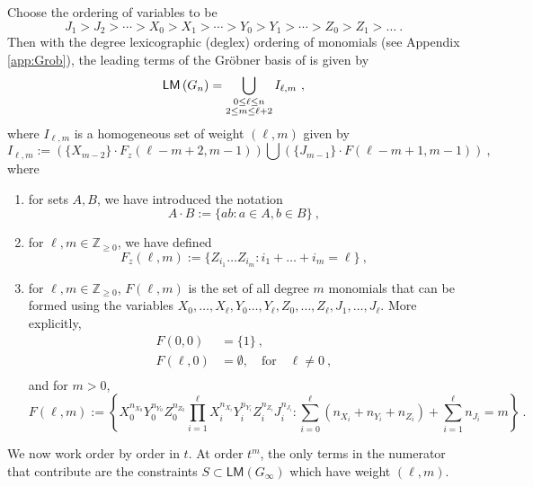 \documentclass[a4paper,10pt]{article}
\newcommand{\mr}[1]{\mathsf{#1}}
\def\IZ{{\mathds{Z}}}
\begin{document}
\begin{conj}
Choose the ordering of variables to be
\begin{equation}\label{eq:var_ord}
J_1>J_2>\cdots>X_0>X_1>\cdots>Y_0>Y_1>\cdots>Z_0>Z_1>\ldots~.
\end{equation}
Then with the degree lexicographic (deglex) ordering of monomials (see Appendix \ref{app:Grob}), the leading terms of the Gr\"{o}bner basis of  is given by 
\begin{equation}
\label{eq:Gr\"{o}bner_basis_Gn}
\mr{LM}\left(G_n\right)=\bigcup_{\substack{0 \leq \ell \leq n \\ 2 \leq m \leq \ell+2}} I_{\ell, m}~,
\end{equation}
where $I_{\ell,m}$ is a homogeneous set of weight $(\ell,m)$ given by
\begin{equation}
I_{\ell,m} := \left(\{X_{m-2}\}\cdot F_z(\ell-m+2, m-1)\right)\bigcup \left(\{J_{m-1}\}\cdot F(\ell-m+1, m-1)\right)~,
\end{equation}
where 
\begin{enumerate}
\item for sets $A,B$, we have introduced the notation
\begin{equation}
    A\cdot B:=\{ab:a\in A,b\in B\}~,
\end{equation}
\item for $\ell,m\in\IZ_{\geq 0}$, we have defined
\begin{equation}
F_z(\ell,m) := \{Z_{i_1}\dots Z_{i_m}: i_1+\dots +i_m = \ell\}~,
\end{equation}
\item for $\ell,m\in\IZ_{\geq 0}$, $F(\ell,m)$ is the set of all degree $m$ monomials that can be formed using the variables $X_0,\dots,X_\ell,Y_0\dots,Y_\ell,Z_0,\dots,Z_\ell,J_1,\dots,J_\ell$. More explicitly, 
\begin{equation}
\begin{aligned}
F(0,0) &= \{1\}~, \\
F(\ell,0) &= \emptyset, \quad \text{for}\quad \ell\neq 0~,\\
\end{aligned}
\end{equation}
and for $m>0$,
\begin{equation}
F(\ell,m):=\left\{X_0^{n_{X_0}}Y_0^{n_{Y_0}}Z_0^{n_{Z_0}} \prod_{i=1}^\ell X_i^{n_{X_i}}Y_i^{n_{Y_i}}Z_i^{n_{Z_i}}J_i^{n_{J_i}}: \sum_{i=0}^\ell (n_{X_i}+n_{Y_i}+n_{Z_i})+\sum_{i=1}^\ell n_{J_i}=m\right\}~.
\end{equation} 
\end{enumerate}
\end{conj}
\par
We now work order by order in $t$. At order $t^m$, the only terms in the numerator that contribute are the constraints $S\subset\mr{LM}(G_\infty)$ which have weight $(\ell,m)$.
\end{document}
